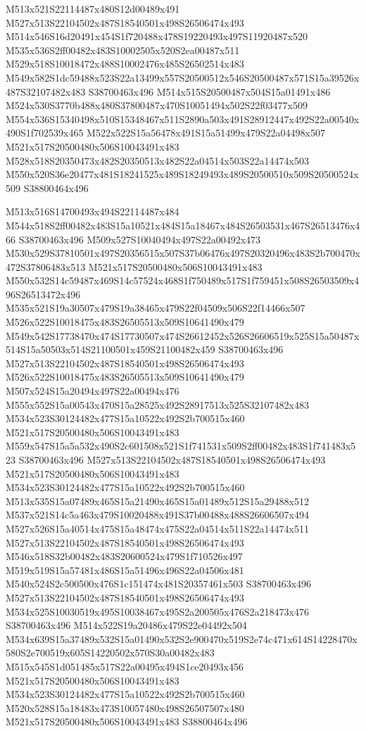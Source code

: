 \documentclass{article}
\begin{document}
\begin{multicols}{2}
M513x521S22114487x480S12d00489x491 M527x513S22104502x487S18540501x498S26506474x493 M514x546S16d20491x454S1f720488x478S19220493x497S11920487x520 M535x536S2ff00482x483S10002505x520S2ea00487x511 M529x518S10018472x488S10002476x485S26502514x483 M549x582S1dc59488x523S22a13499x557S20500512x546S20500487x571S15a39526x487S32107482x483 S38700463x496 M514x515S20500487x504S15a01491x486 M524x530S3770b488x480S37800487x470S10051494x502S22f03477x509 M554x536S15340498x510S15348467x511S2890a503x491S28912447x492S22a00540x490S1f702539x465 M522x522S15a56478x491S15a51499x479S22a04498x507 M521x517S20500480x506S10043491x483 M528x518S20350473x482S20350513x482S22a04514x503S22a14474x503 M550x520S36e20477x481S18241525x489S18249493x489S20500510x509S20500524x509 S38800464x496

M513x516S14700493x494S22114487x484 M544x518S2ff00482x483S15a10521x484S15a18467x484S26503531x467S26513476x466 S38700463x496 M509x527S10040494x497S22a00492x473 M530x529S37810501x497S20356515x507S37b06476x497S20320496x483S2b700470x472S37806483x513 M521x517S20500480x506S10043491x483 M550x532S14c59487x469S14c57524x468S1f750489x517S1f759451x508S26503509x496S26513472x496 M535x521S19a30507x479S19a38465x479S22f04509x506S22f14466x507 M526x522S10018475x483S26505513x509S10641490x479 M549x542S17738470x474S17730507x474S26612452x526S26606519x525S15a50487x514S15a50503x514S21100501x459S21100482x459 S38700463x496 M527x513S22104502x487S18540501x498S26506474x493 M526x522S10018475x483S26505513x509S10641490x479 M507x524S15a20494x497S22a00494x476 M555x552S15a00543x470S15a28525x492S28917513x525S32107482x483 M534x523S30124482x477S15a10522x492S2b700515x460 M521x517S20500480x506S10043491x483 M559x547S15a5a532x490S2c601508x521S1f741531x509S2ff00482x483S1f741483x523 S38700463x496 M527x513S22104502x487S18540501x498S26506474x493 M521x517S20500480x506S10043491x483 M534x523S30124482x477S15a10522x492S2b700515x460 M513x535S15a07489x465S15a21490x465S15a01489x512S15a29488x512 M537x521S14c5a463x479S10020488x491S37b00488x488S26606507x494 M527x526S15a40514x475S15a48474x475S22a04514x511S22a14474x511 M527x513S22104502x487S18540501x498S26506474x493 M546x518S32b00482x483S20600524x479S1f710526x497 M519x519S15a57481x486S15a51496x496S22a04506x481 M540x524S2c500500x476S1c151474x481S20357461x503 S38700463x496 M527x513S22104502x487S18540501x498S26506474x493 M534x525S10030519x495S10038467x495S2a200505x476S2a218473x476 S38700463x496 M514x522S19a20486x479S22e04492x504 M534x639S15a37489x532S15a01490x532S2e900470x519S2e74c471x614S14228470x580S2e700519x605S14220502x570S30a00482x483 M515x545S1d051485x517S22a00495x494S1ce20493x456 M521x517S20500480x506S10043491x483 M534x523S30124482x477S15a10522x492S2b700515x460 M520x528S15a18483x473S10057480x498S26507507x480 M521x517S20500480x506S10043491x483 S38800464x496


\end{multicols}
\end{document}
